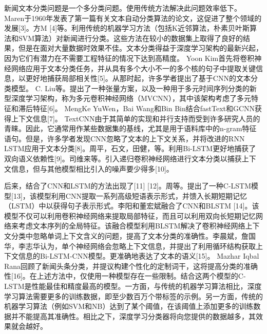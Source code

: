 新闻文本分类问题是一个多分类问题。使用传统方法解决此问题效率低下。 Maren于1960年发表了第一篇有关文本自动分类算法的论文，这促进了整个领域的发展[3]。方M [4]等。利用传统的机器学习方法（包括K近邻算法，朴素贝叶斯算法和SVM算法）对新闻进行分类。这些方法在较小的数据集上取得了良好的结果，但是在面对大量数据时效果不佳。文本分类得益于深度学习架构的最新兴起，因为它们有潜力在不需要工程特征的情况下达到高精度。 Yoon Kim首先将卷积神经网络应用于文本分类任务，并从具有多个大小不一的多个核的句子中提取关键信息，以更好地捕获局部相关性[5]。从那时起，许多学者提出了基于CNN的文本分类模型。 C. Liu等。提出了一种张量方案，以及一种用于多元时间序列分类的新型深度学习架构，称为多元卷积神经网络（MVCNN），其中该架构考虑了多元特征和滞后特征[6]。 MengKe YuWen，Bai Wang和Bin Bin结合fastText和GCNN获得上下文信息[7]。 TextCNN由于其简单的实现和并行支持而受到许多研究人员的青睐。因此，它通常用作某些数据集的基线，尤其是用于语料库中的n-gram特征语句。但是，许多学者发现CNN忽略了文本的上下文关系，并将改进的RNN LSTM应用于文本分类[8]。周平，石文，田健，等。利用Bi-LSTM更好地捕获了双向语义依赖性[9]。司维来等。引入递归卷积神经网络进行文本分类以捕获上下文信息，但与其他模型相比引入的噪声要少得多[10]。

后来，结合了CNN和LSTM的方法出现了[11] [12]。周等。提出了一种C-LSTM模型[13]，该模型利用CNN提取一系列高级短语表示形式，并馈入长期短期记忆（LSTM）中以获得句子表示形式。李阳和董宏斌融合了CNN和BLSTM [14]。该模型不仅可以利用卷积神经网络来提取局部特征，而且可以利用双向长短期记忆网络来考虑文本序列的全局特征。该融合模型利用BLSTM解决了卷积神经网络上下文分类中忽略单词上下文含义的问题，提高了文本分类的准确性。李晨斌，詹国华，李志华认为，单个神经网络会忽略上下文信息，并提出了利用循环结构获取上下文信息的Bi-LSTM-CNN模型。更准确地表达了文本的语义[15]。 Mazhar Iqbal Rana回顾了新闻头条分类，并提议构建个性化的定制词干，这将提高分类的准确性[16]。在上述方法中，仅使用一种模型存在一些限制。结合这两个模型的C-LSTM是性能最佳和精度最高的模型。一方面，与传统的机器学习算法相比，深度学习算法需要更多的训练数据，即至少数百万个带标签的示例。另一方面，传统的机器学习算法（例如SVM和NB）达到了某个阈值，在该阈值上添加更多的训练数据并不能提高其准确性。相比之下，深度学习分类器将向您提供的数据越多，其效果就会越好。